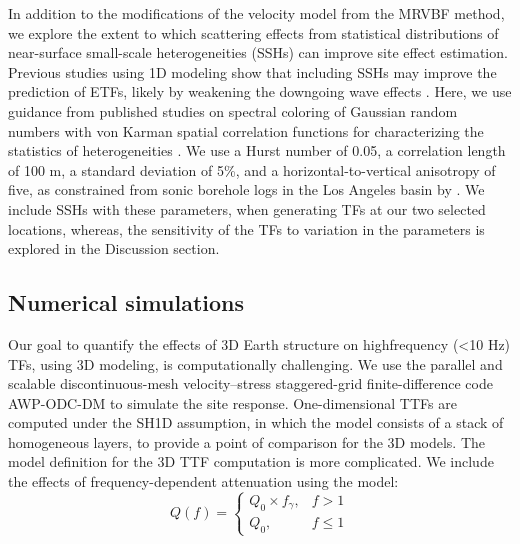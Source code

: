 {In addition to the modifications of the velocity model from the MRVBF method, we explore the extent to which scattering effects from statistical distributions of near-surface small-scale heterogeneities (SSHs) can improve site effect estimation. Previous studies using 1D modeling show that including SSHs may improve the prediction of ETFs, likely by weakening the downgoing wave effects \citep{nourFiniteElementModel2003,thompsonTaxonomySiteResponse2012}. Here, we use guidance from published studies on spectral coloring of Gaussian random numbers with von Karman spatial correlation functions for characterizing the statistics of heterogeneities \citep[see \cref{app:A}; as well as, e.g.,][]{frankelFiniteDifferenceSimulations1986,withersGroundMotionIntraevent2019}. We use a Hurst number of 0.05, a correlation length of 100 m, a standard deviation of 5\%, and a horizontal-to-vertical anisotropy of five, as constrained from sonic borehole logs in the Los Angeles basin by \citet{savranModelSmallscaleCrustal2016}. We include SSHs with these parameters, when generating TFs at our two selected locations, whereas, the sensitivity of the TFs to variation in the parameters is explored in the Discussion section.

\subsection{Numerical simulations}
Our goal to quantify the effects of 3D Earth structure on highfrequency (<10 Hz) TFs, using 3D modeling, is computationally challenging. We use the parallel and scalable discontinuous-mesh velocity–stress staggered-grid finite-difference code AWP-ODC-DM \citep{olsenSimulationThreeDimensional1994,cuiScalableEarthquakeSimulation2010,nieFourthOrderStaggered2017} to simulate the site response. One-dimensional TTFs are computed under the SH1D assumption, in which the model consists of a stack of homogeneous layers, to provide a point of comparison for the 3D models. The model definition for the 3D TTF computation is more complicated. We include the effects of frequency-dependent attenuation using the model:
\begin{equation}
  Q(f) =
  \begin{cases}
    Q_0 \times f_\gamma, & f > 1   \\
    Q_0,                 & f \le 1
    \label{eq:etf-4}
  \end{cases}
\end{equation}

}
